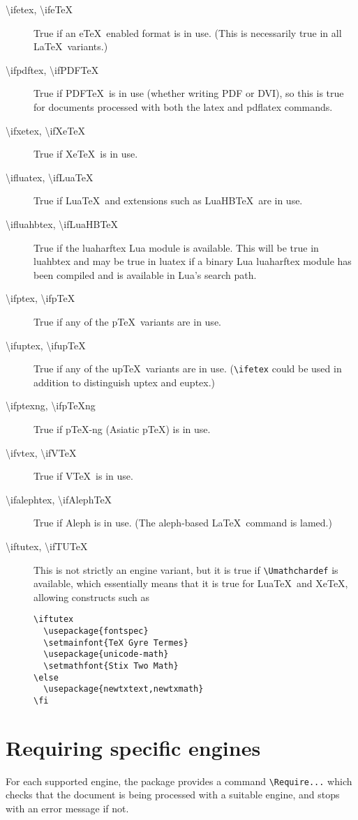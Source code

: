 \documentclass{article}
\newcommand\cs[1]{{\ttfamily\textbackslash #1}}
\begin{document}
\begin{description}
\item[\cs{ifetex},      \cs{ifeTeX}]
True if an e\TeX\ enabled format is in use. (This is necessarily true
in all \LaTeX\ variants.)
\item[\cs{ifpdftex},    \cs{ifPDFTeX}]
True if PDF\TeX\ is in use (whether writing PDF or DVI), so this is
true for documents processed with both the  \textsf{latex} and
\textsf{pdflatex} commands.
\item[\cs{ifxetex},     \cs{ifXeTeX}]
True if Xe\TeX\ is in use.
\item[\cs{ifluatex},    \cs{ifLuaTeX}]
True if Lua\TeX\ and extensions such as LuaHB\TeX\ are in use.
\item[\cs{ifluahbtex},  \cs{ifLuaHBTeX}]
True if the \textsf{luaharftex} Lua module is available.
This will be true in \textsf{luahbtex} and may be true in
\textsf{luatex} if a binary Lua \textsf{luaharftex} module has been
compiled and is available in Lua's search path.
\item[\cs{ifptex},      \cs{ifpTeX}]
True if any of the p\TeX\ variants are in use.
\item[\cs{ifuptex},     \cs{ifupTeX}]
True if any of the up\TeX\ variants are in use. (\verb|\ifetex| could
be used in addition to distinguish \textsf{uptex} and \textsf{euptex}.)
\item[\cs{ifptexng},    \cs{ifpTeXng}]
True if p\TeX-ng (Asiatic p\TeX) is in use.
\item[\cs{ifvtex},      \cs{ifVTeX}]
True if V\TeX\ is in use.
\item[\cs{ifalephtex},  \cs{ifAlephTeX}]
True if Aleph is in use. (The \textsf{aleph}-based \LaTeX\ command is
\textsf{lamed}.)
\item[\cs{iftutex},     \cs{ifTUTeX}]
This is not strictly an engine variant, but it is true if
\verb|\Umathchardef| is available, which essentially means that it is
true for Lua\TeX\ and Xe\TeX, allowing constructs such as
\begin{verbatim}
\iftutex
  \usepackage{fontspec}
  \setmainfont{TeX Gyre Termes}
  \usepackage{unicode-math}
  \setmathfont{Stix Two Math}
\else
  \usepackage{newtxtext,newtxmath}
\fi
\end{verbatim}

\end{description}

\section{Requiring specific engines}
For each supported engine, the package provides a command
\verb|\Require...| which checks that the document is being processed
with a suitable engine, and stops with an error message if not.
\end{document}
